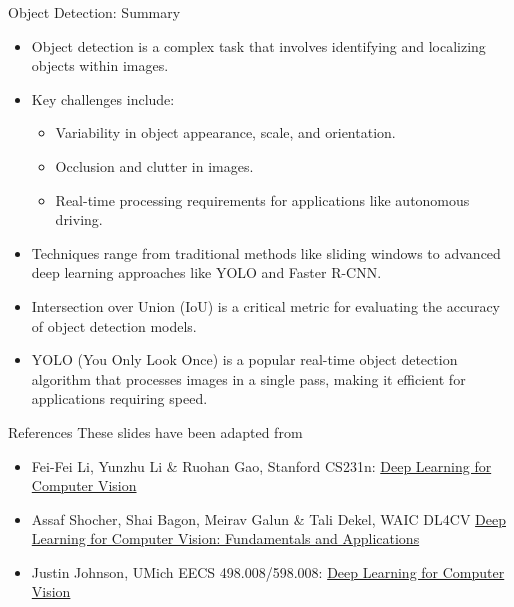 \begin{frame}[allowframebreaks]{Object Detection: Summary}
\begin{itemize}
    \item Object detection is a complex task that involves identifying and localizing objects within images.
    \item Key challenges include:
    \begin{itemize}
        \item Variability in object appearance, scale, and orientation.
        \item Occlusion and clutter in images.
        \item Real-time processing requirements for applications like autonomous driving.
    \end{itemize}
    \item Techniques range from traditional methods like sliding windows to advanced deep learning approaches like YOLO and Faster R-CNN.
    \item Intersection over Union (IoU) is a critical metric for evaluating the accuracy of object detection models.
    \item YOLO (You Only Look Once) is a popular real-time object detection algorithm that processes images in a single pass, making it efficient for applications requiring speed.
\end{itemize}
\end{frame}

\begin{frame}{References}
These slides have been adapted from
\begin{itemize}
    \item Fei-Fei Li, Yunzhu Li \& Ruohan Gao, Stanford CS231n: \href{http://cs231n.stanford.edu/index.html}{Deep Learning for Computer Vision}
    \item Assaf Shocher, Shai Bagon, Meirav Galun \& Tali Dekel, WAIC DL4CV \href{https://dl4cv.github.io/index.html}{Deep Learning for Computer Vision: Fundamentals and Applications}
    \item Justin Johnson, UMich EECS 498.008/598.008: \href{https://web.eecs.umich.edu/~justincj/teaching/eecs498/WI2022/}{Deep Learning for Computer Vision}
\end{itemize}

\end{frame}